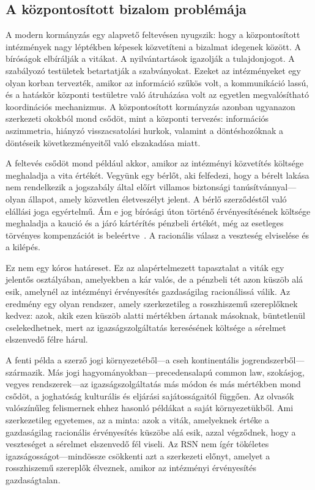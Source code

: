 \documentclass[11pt,a4paper,twocolumn]{article}
\begin{document}
\subsection{A központosított bizalom problémája}

A modern kormányzás egy alapvető feltevésen nyugszik: hogy a központosított intézmények nagy léptékben képesek közvetíteni a bizalmat idegenek között. A bíróságok elbírálják a vitákat. A nyilvántartások igazolják a tulajdonjogot. A szabályozó testületek betartatják a szabványokat. Ezeket az intézményeket egy olyan korban tervezték, amikor az információ szűkös volt, a kommunikáció lassú, és a hatáskör központi testületre való átruházása volt az egyetlen megvalósítható koordinációs mechanizmus. A központosított kormányzás azonban ugyanazon szerkezeti okokból mond csődöt, mint a központi tervezés: információs aszimmetria, hiányzó visszacsatolási hurkok, valamint a döntéshozóknak a döntéseik következményeitől való elszakadása miatt.

A feltevés csődöt mond például akkor, amikor az intézményi közvetítés költsége meghaladja a vita értékét. Vegyünk egy bérlőt, aki felfedezi, hogy a bérelt lakása nem rendelkezik a jogszabály által előírt villamos biztonsági tanúsítvánnyal---olyan állapot, amely közvetlen életveszélyt jelent. A bérlő szerződéstől való elállási joga egyértelmű. Ám e jog bírósági úton történő érvényesítésének költsége meghaladja a kaució és a járó kártérítés pénzbeli értékét, még az esetleges törvényes kompenzációt is beleértve~\cite{czcourtfees}. A racionális válasz a veszteség elviselése és a kilépés.

Ez nem egy kóros határeset. Ez az alapértelmezett tapasztalat a viták egy jelentős osztályában, amelyekben a kár valós, de a pénzbeli tét azon küszöb alá esik, amelynél az intézményi érvényesítés gazdaságilag racionálissá válik. Az eredmény egy olyan rendszer, amely szerkezetileg a rosszhiszemű szereplőknek kedvez: azok, akik ezen küszöb alatti mértékben ártanak másoknak, büntetlenül cselekedhetnek, mert az igazságszolgáltatás keresésének költsége a sérelmet elszenvedő félre hárul.

A fenti példa a szerző jogi környezetéből---a cseh kontinentális jogrendszerből---származik. Más jogi hagyományokban---precedensalapú common law, szokásjog, vegyes rendszerek---az igazságszolgáltatás más módon és más mértékben mond csődöt, a joghatóság kulturális és eljárási sajátosságaitól függően. Az olvasók valószínűleg felismernek ehhez hasonló példákat a saját környezetükből. Ami szerkezetileg egyetemes, az a minta: azok a viták, amelyeknek értéke a gazdaságilag racionális érvényesítés küszöbe alá esik, azzal végződnek, hogy a veszteséget a sérelmet elszenvedő fél viseli. Az RSN nem ígér tökéletes igazságosságot---mindössze csökkenti azt a szerkezeti előnyt, amelyet a rosszhiszemű szereplők élveznek, amikor az intézményi érvényesítés gazdaságtalan.
\end{document}
